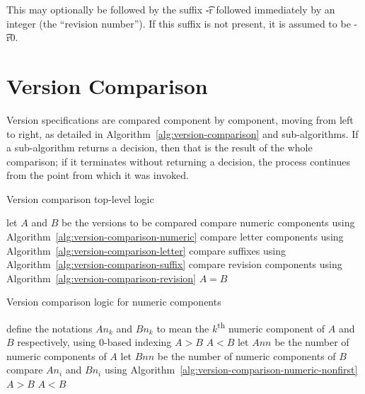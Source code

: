 This may optionally be followed by the suffix \t{-r} followed immediately by an integer (the
``revision number''). If this suffix is not present, it is assumed to be \t{-r0}.

\section{Version Comparison}

Version specifications are compared component by component, moving from left to right,
as detailed in Algorithm~\ref{alg:version-comparison} and sub-algorithms.
If a sub-algorithm returns a decision, then that is the result of the whole comparison;
if it terminates without returning a decision, the process continues from the point
from which it was invoked.

\begin{algorithm}
\caption{Version comparison top-level logic} \label{alg:version-comparison}
\begin{algorithmic}[1]
    \STATE let $A$ and $B$ be the versions to be compared
    \STATE compare numeric components using Algorithm~\ref{alg:version-comparison-numeric}
    \STATE compare letter components using Algorithm~\ref{alg:version-comparison-letter}
    \STATE compare suffixes using Algorithm~\ref{alg:version-comparison-suffix}
    \STATE compare revision components using Algorithm~\ref{alg:version-comparison-revision}
    \RETURN $A=B$
\end{algorithmic}
\end{algorithm}

\begin{algorithm}
\caption{Version comparison logic for numeric components} \label{alg:version-comparison-numeric}
\begin{algorithmic}[1]
  \STATE define the notations $An_k$ and $Bn_k$ to mean the $k$\textsuperscript{th} numeric component of $A$ and $B$ respectively, using $0$-based indexing
    \RETURN $A>B$
    \RETURN $A<B$
  \ENDIF
  \STATE let $Ann$ be the number of numeric components of $A$
  \STATE let $Bnn$ be the number of numeric components of $B$
    \STATE compare $An_i$ and $Bn_i$ using Algorithm~\ref{alg:version-comparison-numeric-nonfirst}
  \ENDFOR
    \RETURN $A>B$
    \RETURN $A<B$
  \ENDIF
\end{algorithmic}
\end{algorithm}

